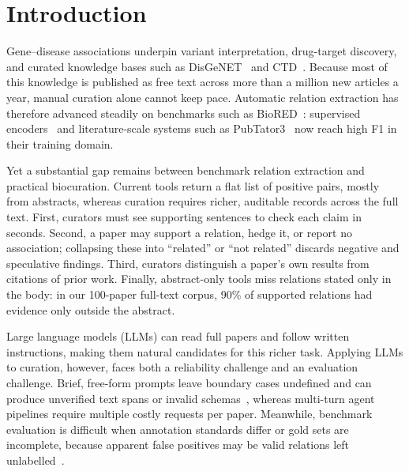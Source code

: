 \documentclass[preprint,10pt,letterpaper]{elsarticle}
\begin{document}
\section{Introduction}

Gene--disease associations underpin variant interpretation, drug-target discovery, and curated knowledge bases such as DisGeNET~\cite{pinero2020disgenet} and CTD~\cite{davis2023ctd}. Because most of this knowledge is published as free text across more than a million new articles a year, manual curation alone cannot keep pace. Automatic relation extraction has therefore advanced steadily on benchmarks such as BioRED~\cite{luo2022biored}: supervised encoders~\cite{lee2020biobert,gu2021pubmedbert,lai2023biorex} and literature-scale systems such as PubTator3~\cite{wei2024pubtator3} now reach high F1 in their training domain.

Yet a substantial gap remains between benchmark relation extraction and practical biocuration. Current tools return a flat list of positive pairs, mostly from abstracts, whereas curation requires richer, auditable records across the full text. First, curators must see supporting sentences to check each claim in seconds. Second, a paper may support a relation, hedge it, or report no association; collapsing these into ``related'' or ``not related'' discards negative and speculative findings. Third, curators distinguish a paper's own results from citations of prior work. Finally, abstract-only tools miss relations stated only in the body: in our 100-paper full-text corpus, 90\% of supported relations had evidence only outside the abstract.

Large language models (LLMs) can read full papers and follow written instructions, making them natural candidates for this richer task. Applying LLMs to curation, however, faces both a reliability challenge and an evaluation challenge. Brief, free-form prompts leave boundary cases undefined and can produce unverified text spans or invalid schemas~\cite{chen2025benchmarking,wadhwa2023revisiting}, whereas multi-turn agent pipelines require multiple costly requests per paper. Meanwhile, benchmark evaluation is difficult when annotation standards differ or gold sets are incomplete, because apparent false positives may be valid relations left unlabelled~\cite{wadhwa2023revisiting,fan2024evaluating}.
\end{document}
